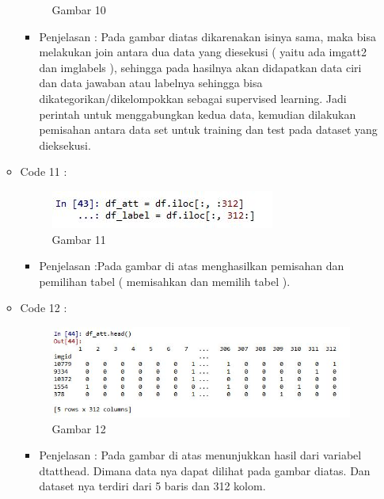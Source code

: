 \begin{enumerate}
\begin{itemize}
\begin{figure}[ht]
\caption{Gambar 10}
\label{contoh}
\end{figure}
\par
\begin{itemize}
\item Penjelasan : Pada gambar diatas dikarenakan isinya sama, maka bisa melakukan join antara dua data yang diesekusi ( yaitu ada imgatt2 dan imglabels ), sehingga pada hasilnya akan didapatkan data ciri dan data jawaban atau labelnya sehingga bisa dikategorikan/dikelompokkan sebagai supervised learning. Jadi perintah untuk menggabungkan kedua data, kemudian dilakukan pemisahan antara data set untuk training dan test pada dataset yang dieksekusi.
\par
\par
\end{itemize}
\item Code 11 :
\par
\begin{figure}[ht]
\centering
\includegraphics[scale=0.7]{figures/pd11.jpg}
\caption{Gambar 11}
\label{contoh}
\end{figure}
\par
\begin{itemize}
\item Penjelasan :Pada gambar di atas menghasilkan pemisahan dan pemilihan tabel ( memisahkan dan memilih tabel ). 
\par
\par
\end{itemize}
\item Code 12 :
\par
\begin{figure}[ht]
\centering
\includegraphics[scale=0.7]{figures/pd12.jpg}
\caption{Gambar 12}
\label{contoh}
\end{figure}
\par
\begin{itemize}
\item Penjelasan : Pada gambar di atas menunjukkan hasil dari variabel dtatthead. Dimana data nya dapat dilihat pada gambar diatas. Dan dataset nya terdiri dari 5 baris dan 312 kolom.

\end{itemize}
\end{itemize}
\end{enumerate}
